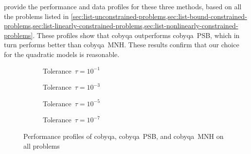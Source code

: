  provide the performance and data profiles for these three methods, based on all the problems listed in \cref{sec:list-unconstrained-problems,sec:list-bound-constrained-problems,sec:list-linearly-constrained-problems,sec:list-nonlinearly-constrained-problems}.
These profiles show that \gls{cobyqa} outperforms \gls{cobyqa}~PSB, which in turn performs better than \gls{cobyqa}~MNH.
These results confirm that our choice for the quadratic models is reasonable.

\begin{figure}[ht]
    \centering
    \begin{subfigure}[b]{0.49\textwidth}
        \centering
        \caption{Tolerance~$\tau = 10^{-1}$}
    \end{subfigure}
    \hfill
    \begin{subfigure}[b]{0.49\textwidth}
        \centering
        \caption{Tolerance~$\tau = 10^{-3}$}
    \end{subfigure}
    \begin{subfigure}[b]{0.49\textwidth}
        \centering
        \caption{Tolerance~$\tau = 10^{-5}$}
    \end{subfigure}
    \hfill
    \begin{subfigure}[b]{0.49\textwidth}
        \centering
        \caption{Tolerance~$\tau = 10^{-7}$}
    \end{subfigure}
    \caption{Performance profiles of \gls{cobyqa}, \gls{cobyqa}~PSB, and \gls{cobyqa}~MNH on all problems}
    \label{fig:perf-models}
\end{figure}

